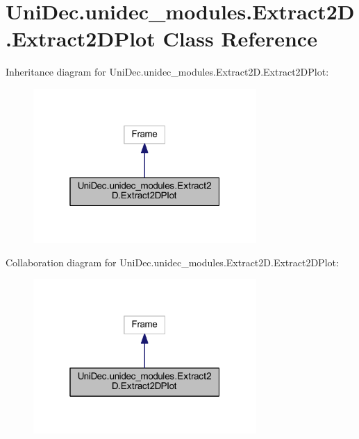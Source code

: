 \hypertarget{class_uni_dec_1_1unidec__modules_1_1_extract2_d_1_1_extract2_d_plot}{}\section{Uni\+Dec.\+unidec\+\_\+modules.\+Extract2\+D.\+Extract2\+D\+Plot Class Reference}
\label{class_uni_dec_1_1unidec__modules_1_1_extract2_d_1_1_extract2_d_plot}


Inheritance diagram for Uni\+Dec.\+unidec\+\_\+modules.\+Extract2\+D.\+Extract2\+D\+Plot\+:\nopagebreak
\begin{figure}[H]
\begin{center}
\leavevmode
\includegraphics[width=241pt]{class_uni_dec_1_1unidec__modules_1_1_extract2_d_1_1_extract2_d_plot__inherit__graph}
\end{center}
\end{figure}


Collaboration diagram for Uni\+Dec.\+unidec\+\_\+modules.\+Extract2\+D.\+Extract2\+D\+Plot\+:\nopagebreak
\begin{figure}[H]
\begin{center}
\leavevmode
\includegraphics[width=241pt]{class_uni_dec_1_1unidec__modules_1_1_extract2_d_1_1_extract2_d_plot__coll__graph}
\end{center}
\end{figure}
